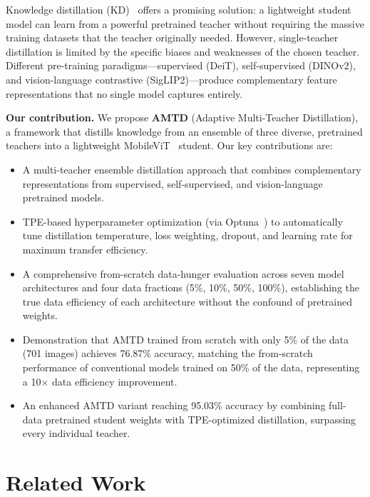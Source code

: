 \documentclass[journal]{IEEEtran}
\begin{document}
Knowledge distillation (KD)~\cite{hinton2015distilling} offers a promising solution: a
lightweight student model can learn from a powerful pretrained teacher without requiring
the massive training datasets that the teacher originally needed. However, single-teacher
distillation is limited by the specific biases and weaknesses of the chosen teacher.
Different pre-training paradigms---supervised (DeiT), self-supervised (DINOv2), and
vision-language contrastive (SigLIP2)---produce complementary feature representations
that no single model captures entirely.

\textbf{Our contribution.} We propose \textbf{AMTD} (Adaptive Multi-Teacher Distillation), a
framework that distills knowledge from an ensemble of three diverse, pretrained teachers into
a lightweight MobileViT~\cite{mehta2021mobilevit} student. Our key contributions are:

\begin{itemize}
    \item A multi-teacher ensemble distillation approach that combines complementary
    representations from supervised, self-supervised, and vision-language pretrained models.
    \item TPE-based hyperparameter optimization (via Optuna~\cite{akiba2019optuna}) to
    automatically tune distillation temperature, loss weighting, dropout, and learning rate
    for maximum transfer efficiency.
    \item A comprehensive from-scratch data-hunger evaluation across seven model architectures
    and four data fractions (5\%, 10\%, 50\%, 100\%), establishing the true data efficiency
    of each architecture without the confound of pretrained weights.
    \item Demonstration that AMTD trained from scratch with only 5\% of the data (701 images)
    achieves 76.87\% accuracy, matching the from-scratch performance of conventional models
    trained on 50\% of the data, representing a 10$\times$ data efficiency improvement.
    \item An enhanced AMTD variant reaching 95.03\% accuracy by combining full-data pretrained
    student weights with TPE-optimized distillation, surpassing every individual teacher.
\end{itemize}

\section{Related Work}
\label{sec:related}
\end{document}
